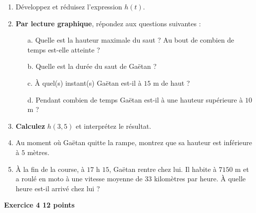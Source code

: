 \documentclass[11pt]{article}
\begin{document}
\begin{enumerate}
\item Développez et réduisez l'expression $h(t)$. 
\item \textbf{Par lecture graphique}, répondez aux questions suivantes : 
\begin{itemize}
\item[a.] Quelle est la hauteur maximale du saut ? Au bout de combien de temps est-elle atteinte ? 
\item[b.] Quelle est la durée du saut de Gaëtan ?
\item[c.] À quel(s) instant(s) Gaëtan est-il à $15$ m de haut ? 
\item[d.] Pendant combien de temps Gaëtan est-il à une hauteur supérieure à $10$ m ? 
\end{itemize}
\item \textbf{Calculez} $h(3,5)$ et interprétez le résultat. 
\item Au moment où Gaëtan quitte la rampe, montrez que sa hauteur est inférieure à $5$ mètres. 
\item À la fin de la course, à $17$ h $15$, Gaëtan rentre chez lui. Il habite à $7150$ m et a roulé en moto à une vitesse moyenne de $33$ kilomètres par heure. À quelle heure est-il arrivé chez lui ? 
\end{enumerate}

\newpage
 \textbf{\large{}Exercice 4   \hfill 12 points}
 
\end{document}
